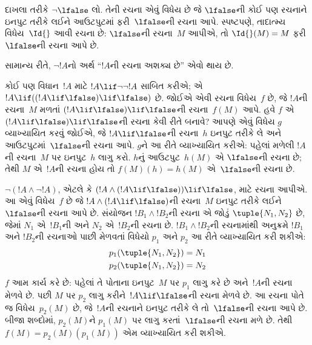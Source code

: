 \begin{ex}
દાખલા તરીકે $\lnot \lfalse$ લો. તેની રચના એવું વિધેય છે જે
$\lfalse$ની કોઈ પણ રચનાને ઇનપુટ તરીકે લઈને આઉટપુટમાં
ફરી~$\lfalse$ની રચના આપે. સ્પષ્ટપણે, તાદાત્મ્ય
વિધેય~$\Id{}$ આવી રચના છે: $\lfalse$ની રચના~$M$ આપીએ,
તો $\Id{}(M) = M$ ફરી~$\lfalse$ની રચના આપે છે.
\end{ex}

સામાન્ય રીતે, $\lnot !A$નો અર્થ ``$!A$ની રચના અશક્ય છે'' એવો થાય છે.

\begin{ex}
કોઈ પણ વિધાન~$!A$ માટે $!A \lif \lnot \lnot !A$ સાબિત કરીએ;
એ $!A \lif ((!A \lif \lfalse) \lif \lfalse)$ છે. જોઈએ
એવી રચના વિધેય~$f$ છે, જે $!A$ની રચના~$M$ મળતાં
$(!A \lif \lfalse) \lif \lfalse$ની રચના~$f(M)$ આપે.
હવે $f$ એ $(!A \lif \lfalse) \lif \lfalse$ની રચના કેવી
રીતે બનાવે? આપણે એવું વિધેય $g$ વ્યાખ્યાયિત કરવું જોઈએ,
જે $!A \lif \lfalse$ની રચના~$h$ ઇનપુટ તરીકે લે અને
આઉટપુટમાં~$\lfalse$ની રચના આપે. $g$ને આ રીતે વ્યાખ્યાયિત
કરીએ: પહેલાં મળેલી $!A$ની રચના~$M$ પર ઇનપુટ~$h$ લાગુ કરો.
$h$નું આઉટપુટ~$h(M)$ એ $\lfalse$ની રચના છે; તેથી $M$
એ~$!A$ની રચના હોય તો $f(M)(h) = h(M)$ એ~$\lfalse$ની
રચના છે.
\end{ex}

\begin{ex}
$\lnot(!A \land \lnot !A)$, એટલે કે $(!A
\land (!A \lif \lfalse)) \lif \lfalse$, માટે રચના આપીએ.
આ એવું વિધેય~$f$ છે જે $!A \land (!A \lif \lfalse)$ની
રચના~$M$ ઇનપુટ તરીકે લઈને~$\lfalse$ની રચના આપે છે.
સંયોજન $!B_1 \land !B_2$ની રચના એ જોડું $\tuple{N_1, N_2}$
છે, જેમાં $N_1$ એ~$!B_1$ની અને $N_2$ એ~$!B_2$ની રચના છે.
$!B_1 \land !B_2$ની રચનામાંથી અનુક્રમે $!B_1$ અને $!B_2$ની
રચનાઓ પાછી મેળવતાં વિધેયો $p_1$ અને $p_2$ આ રીતે વ્યાખ્યાયિત
કરી શકીએ:
\begin{align*}
  p_1(\tuple{N_1, N_2}) &= N_1\\
  p_2(\tuple{N_1, N_2}) &= N_2
\end{align*}
$f$ આમ કાર્ય કરે છે: પહેલાં તે પોતાના ઇનપુટ~$M$ પર $p_1$
લાગુ કરે છે અને~$!A$ની રચના મેળવે છે. પછી $M$ પર $p_2$
લાગુ કરીને~$!A \lif \lfalse$ની રચના મેળવે છે. આ રચના
પોતે જ વિધેય~$p_2(M)$ છે, જે~$!A$ની રચનાને ઇનપુટ તરીકે
લે તો~$\lfalse$ની રચના આપે છે. બીજા શબ્દોમાં, $p_2(M)$ને
$p_1(M)$ પર લાગુ કરતાં~$\lfalse$ની રચના મળે છે. તેથી
$f(M) = p_2(M)(p_1(M))$ એમ વ્યાખ્યાયિત કરી શકીએ.
\end{ex}


